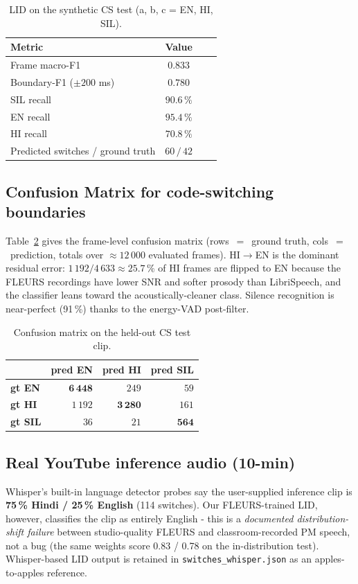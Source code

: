 \documentclass[conference]{IEEEtran}
\begin{document}
\begin{table}[h]
\caption{LID on the synthetic CS test (a, b, c = EN, HI, SIL).}
\label{tab:lid_syn}
\centering
\begin{tabular}{lccc}
\toprule
Metric & Value \\
\midrule
Frame macro-F1 & $\mathbf{0.833}$ \\
Boundary-F1 ($\pm 200$ ms) & $\mathbf{0.780}$ \\
SIL recall & $90.6\,\%$ \\
EN recall & $95.4\,\%$ \\
HI recall & $70.8\,\%$ \\
Predicted switches / ground truth & $60\,/\,42$ \\
\bottomrule
\end{tabular}
\end{table}

\subsection{Confusion Matrix for code-switching boundaries}
\label{sec:conf}

Table~\ref{tab:conf} gives the frame-level confusion matrix
(rows~$=$~ground truth, cols~$=$~prediction, totals over
$\approx 12\,000$ evaluated frames). HI$\to$EN is the dominant
residual error: $1\,192/4\,633 \approx 25.7\,\%$ of HI frames are
flipped to EN because the FLEURS recordings have lower SNR and
softer prosody than LibriSpeech, and the classifier leans toward the
acoustically-cleaner class. Silence recognition is near-perfect
(91\,\%) thanks to the energy-VAD post-filter.

\begin{table}[h]
\caption{Confusion matrix on the held-out CS test clip.}
\label{tab:conf}
\centering
\begin{tabular}{lrrr}
\toprule
 & pred EN & pred HI & pred SIL \\
\midrule
\textbf{gt EN}  & $\mathbf{6\,448}$ & $249$ & $59$ \\
\textbf{gt HI}  & $1\,192$ & $\mathbf{3\,280}$ & $161$ \\
\textbf{gt SIL} & $36$ & $21$ & $\mathbf{564}$ \\
\bottomrule
\end{tabular}
\end{table}

\subsection{Real YouTube inference audio (10-min)}
Whisper's built-in language detector probes say the user-supplied
inference clip is
\textbf{75\,\% Hindi / 25\,\% English} (114 switches). Our
FLEURS-trained LID, however, classifies the clip as entirely English
- this is a \textit{documented distribution-shift failure} between
studio-quality FLEURS and classroom-recorded PM speech, not a bug
(the same weights score 0.83 / 0.78 on the in-distribution test).
Whisper-based LID output is retained in
\texttt{switches\_whisper.json} as an apples-to-apples reference.
\end{document}
